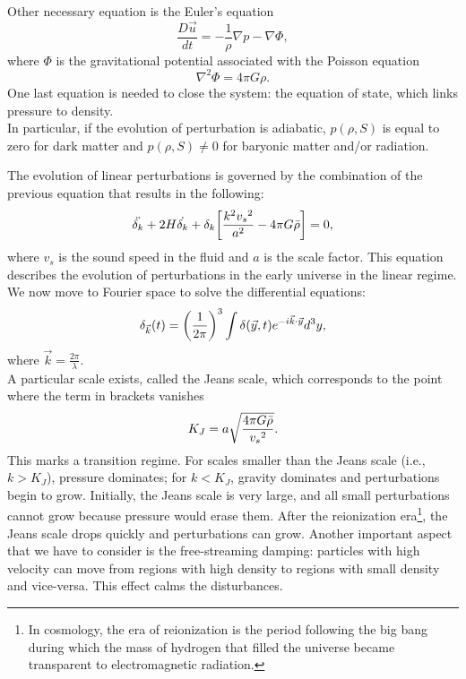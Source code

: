 Other necessary equation is the Euler's equation
\begin{equation}
    \frac{D \Vec{u}}{dt} = - \frac{1}{\rho} \nabla p - \nabla \Phi,
\end{equation}
where $\Phi$ is the gravitational potential associated with the Poisson equation
\begin{equation} \label{Poisson equation}
    \nabla^2\Phi = 4 \pi G \rho.
\end{equation}
One last equation is needed to close the system: the equation of state, which links pressure to density.\\ In particular, if the evolution of perturbation is adiabatic, $p(\rho, S)$ is equal to zero for dark matter and $p(\rho, S) \neq 0$ for baryonic matter and/or radiation.

The evolution of linear perturbations is governed by the combination of the previous equation that results in the following:
\begin{equation}
    \Ddot{\delta_k} + 2H \dot{\delta_k} + \delta_k \qty[\frac{k^2 {v_s}^2}{a^2} - 4 \pi G \Bar{\rho}] = 0,
\end{equation}
where $v_s$ is the sound speed in the fluid and $a$ is the scale factor. This equation describes the evolution of perturbations in the early universe in the linear regime.
We now move to Fourier space to solve the differential equations:
\begin{equation}
    \delta_{\vec{k}} (t) = \qty(\frac{1}{2 \pi})^3 \int \delta(\vec{y}, t) e^{-i \vec{k} \cdot \vec{y}} d^3 y,
\end{equation}
where $\vec{k} = \frac{2 \pi}{\lambda}$.\\
A particular scale exists, called the Jeans scale, which corresponds to the point where the term in brackets vanishes
\begin{equation}
    K_J = a\sqrt{\frac{4 \pi G \Bar{\rho}}{{v_s}^2}}.
\end{equation}
This marks a transition regime. For scales smaller than the Jeans scale (i.e., $k > K_J$), pressure dominates; for $k < K_J$, gravity dominates and perturbations begin to grow.
Initially, the Jeans scale is very large, and all small perturbations cannot grow because pressure would erase them. After the reionization era\footnote{In cosmology, the era of reionization is the period following the big bang during which the mass of hydrogen that filled the universe became transparent to electromagnetic radiation.}, the Jeans scale drops quickly and perturbations can grow. Another important aspect that we have to consider is the free-streaming damping: particles with high velocity can move from regions with high density to regions with small density and vice-versa. This effect calms the disturbances.
